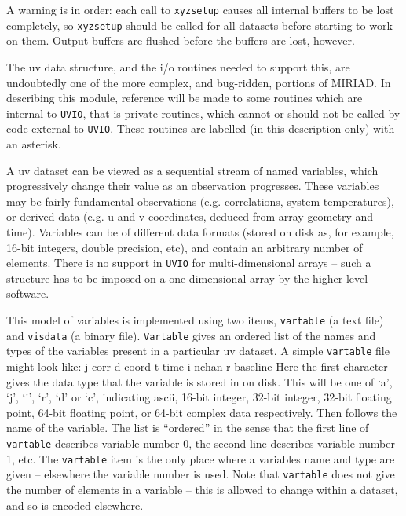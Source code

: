 A warning is in order:  each call to {\tt xyzsetup} causes all internal
buffers to be lost completely, so {\tt xyzsetup} should be called for
all datasets before starting to work on them.  Output buffers are flushed
before the buffers are lost, however.


The uv data structure, and the i/o routines needed to support this, are
undoubtedly one of the more complex, and bug-ridden, portions of MIRIAD.
In describing this module, reference will be made to some routines which are
internal to {\tt UVIO}, that is private routines, which cannot or should not
be called by code external to {\tt UVIO}. These routines are labelled (in
this description only) with an asterisk. 

A uv dataset can be viewed as a sequential stream of named variables,
which progressively change their value as an observation progresses.
These variables may be fairly fundamental observations (e.g. correlations,
system temperatures), or derived data (e.g. u and v coordinates, deduced from
array geometry and time).  Variables can be of different data formats (stored
on disk as, for example, 16-bit integers, double precision, etc), and contain
an arbitrary number of elements.  There is no support in {\tt UVIO} for
multi-dimensional arrays -- such a structure has to be imposed on a one
dimensional array by the higher level software.


This model of variables is implemented using two items, {\tt vartable} (a text
file) and {\tt visdata} (a binary file). {\tt Vartable} gives an ordered list
of the names and types of the variables present in a particular uv dataset.
A simple {\tt vartable} file might look like:
{\ninepoint\begintt
    j corr
    d coord
    t time
    i nchan
    r baseline
\endtt}
Here the first character gives the data type that the variable is stored in on
disk. This will be one of `a', `j',
`i', `r', `d' or `c', indicating ascii, 16-bit integer, 32-bit integer, 32-bit
floating point, 64-bit floating point, or 64-bit complex data respectively.
Then follows the name of the variable. The list is ``ordered'' in the sense
that the first line of {\tt vartable} describes variable number 0, the second
line describes variable number 1, etc. The {\tt vartable} item is the only
place where a variables name and type are given -- elsewhere the variable
number is used. Note that {\tt vartable} does not give the number of elements
in a variable -- this is allowed to change within a dataset, and so is
encoded elsewhere.

